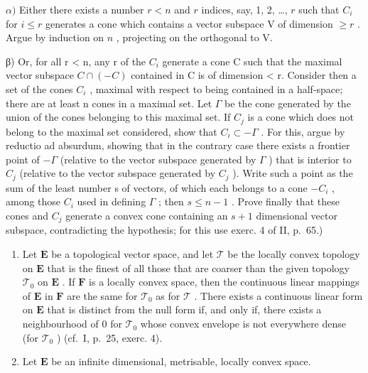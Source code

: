 \(\alpha)\) Either there exists a number \(r < n\) and \(r\) indices, say, 1, 2, \ldots, \(r\) such that \(C_i\) for \(i \leqslant r\) generates a cone which contains a vector subspace V of dimension \(\geqslant r\) . Argue by induction on \(n\) , projecting on the orthogonal to V.

β) Or, for all r < n, any r of the \(C_{i}\) generate a cone C such that the maximal vector subspace \(C \cap (-C)\) contained in C is of dimension < r. Consider then a set of the cones \(C_{i}\) , maximal with respect to being contained in a half-space; there are at least n cones in a maximal set. Let \(\Gamma\) be the cone generated by the union of the cones belonging to this maximal set. If \(C_{j}\) is a cone which does not belong to the maximal set considered, show that \(C_{i} \subset -\Gamma\) . For this, argue by reductio ad absurdum, showing that in the contrary case there exists a frontier point of \(-\Gamma\) (relative to the vector subspace generated by \(\Gamma\) ) that is interior to \(C_{j}\) (relative to the vector subspace generated by \(C_{j}\) ). Write such a point as the sum of the least number s of vectors, of which each belongs to a cone \(-C_{i}\) , among those \(C_{i}\) used in defining \(\Gamma\) ; then \(s \leqslant n - 1\) . Prove finally that these cones and \(C_{j}\) generate a convex cone containing an \(s + 1\) dimensional vector subspace, contradicting the hypothesis; for this use exerc. 4 of II, p.~65.)

\begin{enumerate}
\def\labelenumi{\arabic{enumi})}
\setcounter{enumi}{22}
\item
  Let \(\mathbf{E}\) be a topological vector space, and let \(\mathcal{T}\) be the locally convex topology on \(\mathbf{E}\) that is the finest of all those that are coarser than the given topology \(\mathcal{T}_0\) on \(\mathbf{E}\) . If \(\mathbf{F}\) is a locally convex space, then the continuous linear mappings of \(\mathbf{E}\) in \(\mathbf{F}\) are the same for \(\mathcal{T}_0\) as for \(\mathcal{T}\) . There exists a continuous linear form on \(\mathbf{E}\) that is distinct from the null form if, and only if, there exists a neighbourhood of 0 for \(\mathcal{T}_0\) whose convex envelope is not everywhere dense (for \(\mathcal{T}_0\) ) (cf.~I, p.~25, exerc. 4).
\item
  Let \(\mathbf{E}\) be an infinite dimensional, metrisable, locally convex space.
\end{enumerate}

